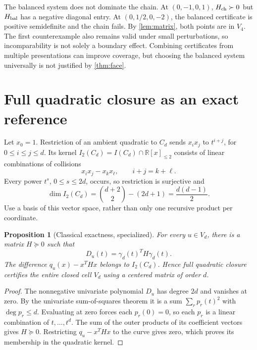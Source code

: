 \documentclass[11pt]{article}
\newtheorem{proposition}[theorem]{Proposition}
\theoremstyle{definition}\newtheorem{definition}[theorem]{Definition}
\theoremstyle{remark}\newtheorem{remark}[theorem]{Remark}
\newcommand{\R}{\mathbb{R}}
\begin{document}
The balanced system does not dominate the chain. At $(0,-1,0,1)$, $H_{\rm ch}\succ0$ but $H_{\rm bal}$ has a negative diagonal entry. At $(0,1/2,0,-2)$, the balanced certificate is positive semidefinite and the chain fails. By \cref{lem:matrix}, both points are in $V_4$. The first counterexample also remains valid under small perturbations, so incomparability is not solely a boundary effect. Combining certificates from multiple presentations can improve coverage, but choosing the balanced system universally is not justified by \cref{thm:face}.

\section{Full quadratic closure as an exact reference}\label{sec:closure}
Let $x_0=1$. Restriction of an ambient quadratic to $C_d$ sends $x_ix_j$ to $t^{i+j}$, for $0\le i\le j\le d$. Its kernel $I_2(C_d)=I(C_d)\cap\R[x]_{\le2}$ consists of linear combinations of collisions
\begin{equation}\label{eq:collisions}
 x_ix_j-x_kx_\ell,\qquad i+j=k+\ell.
\end{equation}
Every power $t^s$, $0\le s\le2d$, occurs, so restriction is surjective and
\begin{equation}\label{eq:count}
 \dim I_2(C_d)=\binom{d+2}{2}-(2d+1)=\frac{d(d-1)}2.
\end{equation}
Use a basis of this vector space, rather than only one recursive product per coordinate.

\begin{proposition}[Classical exactness, specialized]\label{prop:closure}
For every $u\in V_d$, there is a matrix $H\succeq0$ such that
\begin{equation}\label{eq:gram}
 D_u(t)=\gamma_d(t)^TH\gamma_d(t).
\end{equation}
The difference $q_u(x)-x^THx$ belongs to $I_2(C_d)$. Hence full quadratic closure certifies the entire closed cell $V_d$ using a centered matrix of order $d$.
\end{proposition}
\begin{proof}
The nonnegative univariate polynomial $D_u$ has degree $2d$ and vanishes at zero. By the univariate sum-of-squares theorem it is a sum $\sum_r p_r(t)^2$ with $\deg p_r\le d$. Evaluating at zero forces each $p_r(0)=0$, so each $p_r$ is a linear combination of $t,\ldots,t^d$. The sum of the outer products of its coefficient vectors gives $H\succeq0$. Restricting $q_u-x^THx$ to the curve gives zero, which proves its membership in the quadratic kernel.
\end{proof}
\end{document}
